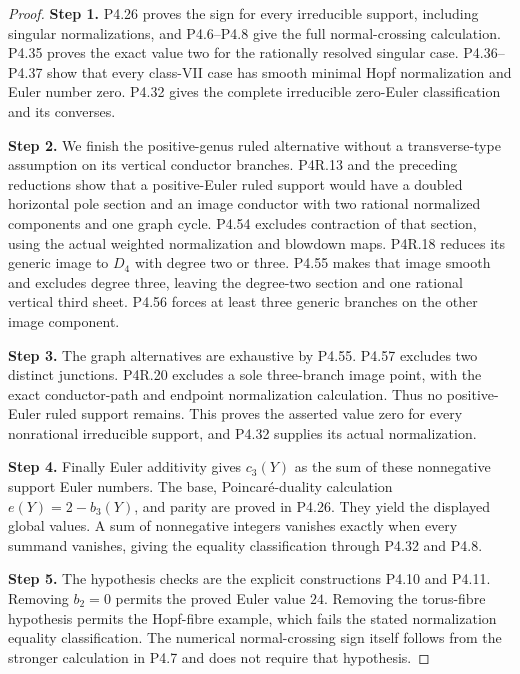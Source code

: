 \begin{proof}
\noindent\textbf{Step 1.} P4.26 proves the sign for every irreducible support,
including singular normalizations, and P4.6--P4.8 give
the full normal-crossing calculation. P4.35 proves the
exact value two for the rationally resolved singular
case. P4.36--P4.37 show that every class-VII case has
smooth minimal Hopf normalization and Euler number
zero. P4.32 gives the complete irreducible zero-Euler
classification and its converses.

\noindent\textbf{Step 2.} We finish the positive-genus ruled alternative without
a transverse-type assumption on its vertical conductor
branches. P4R.13 and the preceding reductions show that
a positive-Euler ruled support would have a doubled
horizontal pole section and an image conductor with two
rational normalized components and one graph cycle.
P4.54 excludes contraction of that section, using the
actual weighted normalization and blowdown maps.
P4R.18 reduces its generic image to $D_4$ with degree
two or three. P4.55 makes that image smooth and excludes
degree three, leaving the degree-two section and one
rational vertical third sheet. P4.56 forces at least
three generic branches on the other image component.

\noindent\textbf{Step 3.} The graph alternatives are exhaustive by P4.55. P4.57
excludes two distinct junctions. P4R.20 excludes a sole
three-branch image point, with the exact conductor-path
and endpoint normalization calculation. Thus no
positive-Euler ruled support remains. This proves the
asserted value zero for every nonrational irreducible
support, and P4.32 supplies its actual normalization.

\noindent\textbf{Step 4.} Finally Euler additivity gives $c_3(Y)$ as the sum of
these nonnegative support Euler numbers. The base,
Poincar\'e-duality calculation $e(Y)=2-b_3(Y)$, and
parity are proved in P4.26. They yield the displayed
global values. A sum of nonnegative integers vanishes
exactly when every summand vanishes, giving the equality
classification through P4.32 and P4.8.

\noindent\textbf{Step 5.} The hypothesis checks are the explicit constructions
P4.10 and P4.11. Removing $b_2=0$ permits the proved
Euler value $24$. Removing the torus-fibre hypothesis
permits the Hopf-fibre example, which fails the stated
normalization equality classification. The numerical
normal-crossing sign itself follows from the stronger
calculation in P4.7 and does not require that hypothesis.
\end{proof}


